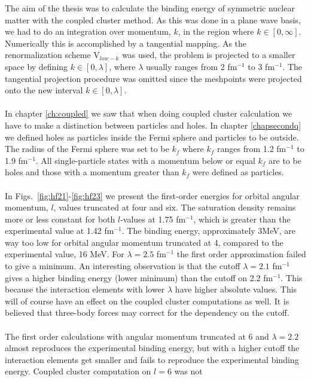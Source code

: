 The aim of the thesis was to calculate the binding energy of symmetric nuclear
matter  with the coupled cluster method. As this was done in a plane wave basis, we had to do an
integration over momentum, $k$, in the region where $k\in[0,\infty]$.
Numerically this is accomplished by a tangential mapping. As the
renormalization scheme V$_{low-k}$ was used, the problem is projected to
a smaller space by defining $k\in[0,\lambda]$, where $\lambda$ usually ranges from 2
fm$^{-1}$ to 3 fm$^{-1}$. The tangential projection procedure was omitted since
the meshpoints were projected onto the new interval $k\in[0,\lambda]$.\\
\\
In chapter \ref{ch:coupled} we saw that when doing coupled cluster calculation
we have to make a distinction between particles and holes. In chapter
\ref{chapsecondq} we defined holes as particles inside the Fermi sphere and
particles to be outside. The radius of the Fermi sphere was set to be $k_f$
where $k_f$ ranges from 1.2 fm$^{-1}$ to 1.9 fm$^{-1}$. All single-particle
states with a momentum below or equal $k_f$ are to be holes and those with a
momentum greater than $k_f$ were defined as particles.\\
\\
In Figs.~\ref{fig:hf21}-\ref{fig:hf23} we present the first-order energies for orbital angular momentum, $l$, values
truncated at four and six.  The saturation density remains more or less constant
for both $l$-values at 1.75 fm$^{-1}$, which is greater than the experimental
value at 1.42 fm$^{-1}$. The binding energy, approximately $3$MeV, are way too low for orbital angular momentum
truncated at 4, compared to the experimental value, 16 MeV. For $\lambda=2.5$
fm$^{-1}$ the first order approximation failed to give a minimum.
An interesting observation is that the
cutoff  $\lambda=2.1$ fm$^{-1}$ gives a higher binding energy (lower minimum) than the cutoff
on 2.2 fm$^{-1}$. This because the  interaction elements with lower $\lambda$
have higher absolute values. This will of course have an effect on the coupled cluster
computations as well. It is believed that three-body forces may correct for the dependency on the cutoff.\\
\\
The first order calculations with angular momentum truncated at 6 and 
$\lambda=2.2$ almost reproduces the experimental binding energy, but with a 
higher cutoff the interaction elements get smaller and fails to reproduce the 
experimental binding energy. Coupled cluster computation on $l=6$ was not 
